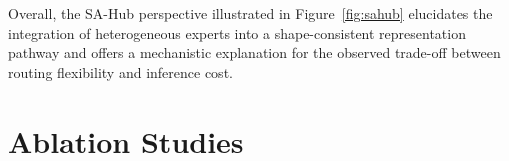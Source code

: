 Overall, the SA-Hub perspective illustrated in Figure~\ref{fig:sahub} elucidates the integration of heterogeneous experts into a shape-consistent representation pathway and offers a mechanistic explanation for the observed trade-off between routing flexibility and inference cost.






\section{Ablation Studies}
\label{sec:ablation}

